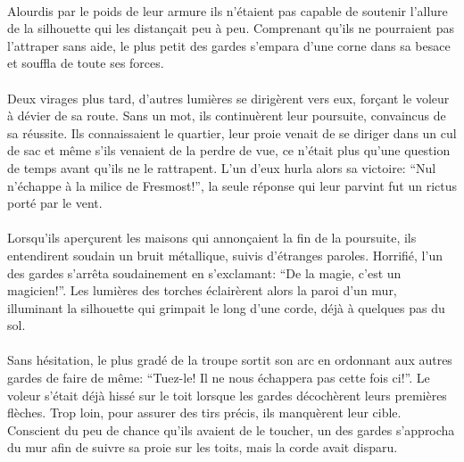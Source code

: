\paragraph{}
Alourdis par le poids de leur armure ils n'étaient pas capable de soutenir
l'allure de la silhouette qui les distançait peu à peu. Comprenant qu'ils ne
pourraient pas l'attraper sans aide, le plus petit des gardes s'empara d'une
corne dans sa besace et souffla de toute ses forces.

\paragraph{}
Deux virages plus tard, d'autres lumières se dirigèrent vers eux, forçant le
voleur à dévier de sa route. Sans un mot, ils continuèrent leur poursuite,
convaincus de sa réussite. Ils connaissaient le quartier, leur proie venait
de se diriger dans un cul de sac et même s'ils venaient de la perdre de vue,
ce n'était plus qu'une question de temps avant qu'ils ne le rattrapent. L'un
d'eux hurla alors sa victoire: ``Nul n'échappe à la milice de Fresmost!'', la
seule réponse qui leur parvint fut un rictus porté par le vent.

\paragraph{}
Lorsqu'ils aperçurent les maisons qui annonçaient la fin de la poursuite, ils
entendirent soudain un bruit métallique, suivis d'étranges paroles. Horrifié,
l'un des gardes s'arrêta soudainement en s'exclamant: ``De la magie, c'est un
magicien!''. Les lumières des torches éclairèrent alors la paroi d'un mur,
illuminant la silhouette qui grimpait le long d'une corde, déjà à quelques pas
du sol.

\paragraph{}
Sans hésitation, le plus gradé de la troupe sortit son arc en ordonnant aux
autres gardes de faire de même: ``Tuez-le! Il ne nous échappera pas cette
fois ci!''. Le voleur s'était déjà hissé sur le toit lorsque les gardes
décochèrent leurs premières flèches. Trop loin, pour assurer des tirs précis,
ils manquèrent leur cible. Conscient du peu de chance qu'ils avaient de le
toucher, un des gardes s'approcha du mur afin de suivre sa proie sur les
toits, mais la corde avait disparu.

\contextswitch


